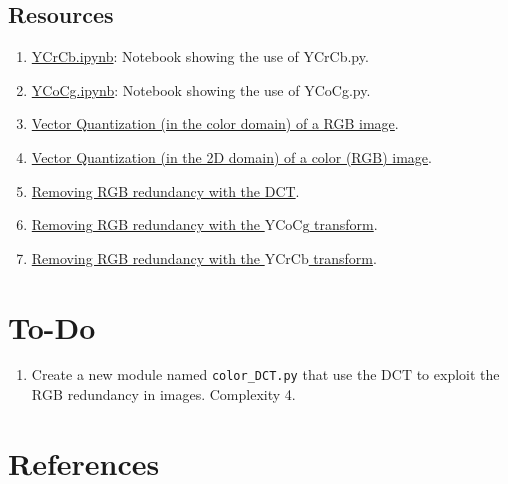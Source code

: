 \subsection*{Resources}
\begin{enumerate}
\item \href{https://github.com/Sistemas-Multimedia/VCF/blob/main/notebooks/YCrCb.ipynb}{YCrCb.ipynb}: Notebook showing the use of YCrCb.py.
\item \href{https://github.com/Sistemas-Multimedia/VCF/blob/main/notebooks/YCoCg.ipynb}{YCoCg.ipynb}: Notebook showing the use of YCoCg.py.
\item \href{https://github.com/vicente-gonzalez-ruiz/vector_quantization/blob/main/docs/RGB_VQ.ipynb}{Vector
    Quantization (in the color domain) of a RGB image}.
\item \href{https://github.com/vicente-gonzalez-ruiz/vector_quantization/blob/main/docs/spatial_color_VQ.ipynb}{Vector
  Quantization (in the 2D domain) of a color (RGB) image}.
\item \href{https://github.com/vicente-gonzalez-ruiz/color_transforms/blob/main/docs/3DCT/3DCT_over_RGB.ipynb}{Removing RGB redundancy with the DCT}.
\item \href{https://github.com/vicente-gonzalez-ruiz/color_transforms/blob/main/docs/YCoCg/YCoCg_over_RGB.ipynb}{Removing RGB redundancy with the $\text{YCoCg}$ transform}.
\item \href{https://github.com/vicente-gonzalez-ruiz/color_transforms/blob/main/docs/YCrCb/YCrCb_over_RGB.ipynb}{Removing RGB redundancy with the $\text{YCrCb}$ transform}.
\end{enumerate}
  
\section*{To-Do}
\begin{enumerate}
\item Create a new module named \texttt{color\_DCT.py} that use the
  $\text{DCT}$ to exploit the $\text{RGB}$ redundancy in
  images. Complexity 4.
\end{enumerate}

\section{References}

\renewcommand{\addcontentsline}[3]{}%

